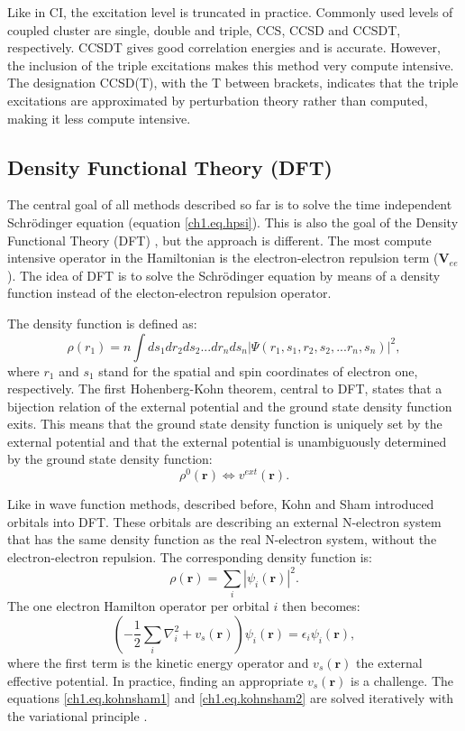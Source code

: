 Like in CI, the excitation level is truncated in practice. Commonly used levels of coupled cluster are single, double and triple, CCS, CCSD and CCSDT, respectively. CCSDT gives good correlation energies and is accurate. However, the inclusion of the triple excitations makes this method very compute intensive. The designation CCSD(T), with the T between brackets, indicates that the triple excitations are approximated by perturbation theory rather than computed, making it less compute intensive.

\subsection{Density Functional Theory (DFT)}
The central goal of all methods described so far is to solve the time independent Schr\"{o}dinger equation (equation \ref{ch1.eq.hpsi}). This is also the goal of the Density Functional Theory (DFT) \cite{jensen, hohenberg, kohnsham}, but the approach is different. The most compute intensive operator in the Hamiltonian is the electron-electron repulsion term ($\mathbf{V}_{ee}$). The idea of DFT is to solve the Schr\"{o}dinger equation by means of a density function instead of the electon-electron repulsion operator.

The density function is defined as:
\begin{equation}
\rho(r_1)=n \int ds_1dr_2ds_2 ... dr_nds_n | \Psi(r_1,s_1,r_2,s_2, ... r_n,s_n)|^2,
\end{equation}
where $r_1$ and $s_1$ stand for the spatial and spin coordinates of electron one, respectively. The first Hohenberg-Kohn theorem, central to DFT, states that a bijection relation of the external potential and the ground state density function exits. This means that the ground state density function is uniquely set by the external potential and
that the external potential is unambiguously determined by the ground state density function:
\begin{equation}
\rho^0(\mathbf{r}) \Leftrightarrow v^{ext}(\mathbf{r}).
\end{equation}

Like in wave function methods, described before, Kohn and Sham introduced orbitals into DFT. These orbitals are describing an external N-electron system that has the same density function as the real N-electron system, without the electron-electron repulsion. The corresponding density function is:
\begin{equation}
\rho(\mathbf{r}) = \sum_i | \psi_i(\mathbf{r})|^2.
\label{ch1.eq.kohnsham1}
\end{equation}
The one electron Hamilton operator per orbital $i$ then becomes:
\begin{equation}
\left( -\frac{1}{2} \sum_i \nabla^2_i + v_s (\mathbf{r}) \right) \psi_i(\mathbf{r}) = \epsilon_i\psi_i(\mathbf{r}),
\label{ch1.eq.kohnsham2}
\end{equation}
where the first term is the kinetic energy operator and $v_s(\mathbf{r})$ the external effective potential. In practice, finding an appropriate $v_s(\mathbf{r})$ is a challenge. The equations \ref{ch1.eq.kohnsham1} and \ref{ch1.eq.kohnsham2} are solved iteratively with the variational principle \cite{varia}.

